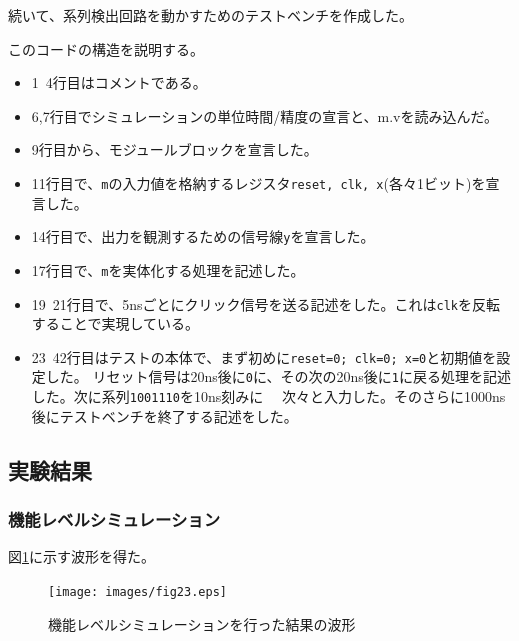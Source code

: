 \documentclass[uplatex]{jsarticle}
\begin{document}
続いて、系列検出回路を動かすためのテストベンチを作成した。



このコードの構造を説明する。

\begin{itemize}
  \item 1~4行目はコメントである。
  \item 6,7行目でシミュレーションの単位時間/精度の宣言と、m.vを読み込んだ。
  \item 9行目から、モジュールブロックを宣言した。
  \item 11行目で、{\tt m}の入力値を格納するレジスタ{\tt reset, clk, x}(各々1ビット)を宣言した。
  \item 14行目で、出力を観測するための信号線{\tt y}を宣言した。
  \item 17行目で、{\tt m}を実体化する処理を記述した。
  \item 19~21行目で、5nsごとにクリック信号を送る記述をした。これは{\tt clk}を反転することで実現している。
  \item 23~42行目はテストの本体で、まず初めに{\tt reset=0; clk=0; x=0}と初期値を設定した。
	  リセット信号は20ns後に{\tt 0}に、その次の20ns後に{\tt 1}に戻る処理を記述した。次に系列{\tt 1001110}を10ns刻みに
	　次々と入力した。そのさらに1000ns後にテストベンチを終了する記述をした。
\end{itemize}

\subsection{実験結果}

\subsubsection{機能レベルシミュレーション}

図\ref{fig:23}に示す波形を得た。

\begin{figure}[htb]
  \begin{center}
    \texttt{[image: images/fig23.eps]}
    \caption{機能レベルシミュレーションを行った結果の波形}
    \label{fig:23}
  \end{center}
\end{figure}
\end{document}
